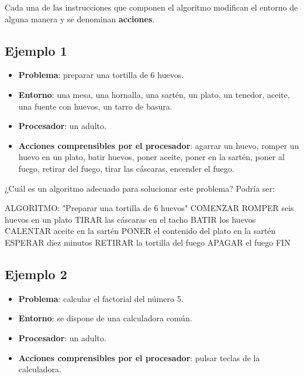 \documentclass[
]{book}
\newenvironment{Shaded}{\begin{snugshade}}{\end{snugshade}}
\newcommand{\NormalTok}[1]{#1}
\providecommand{\tightlist}{%
  \setlength{\itemsep}{0pt}\setlength{\parskip}{0pt}}
\begin{document}
Cada una de las instrucciones que componen el algoritmo modifican el entorno de alguna manera y se denominan \textbf{acciones}.

\hypertarget{ejemplo-1}{%
\subsection{Ejemplo 1}\label{ejemplo-1}}

\begin{itemize}
\tightlist
\item
  \textbf{Problema}: preparar una tortilla de 6 huevos.
\item
  \textbf{Entorno}: una mesa, una hornalla, una sartén, un plato, un tenedor, aceite, una fuente con huevos, un tarro de basura.
\item
  \textbf{Procesador}: un adulto.
\item
  \textbf{Acciones comprensibles por el procesador}: agarrar un huevo, romper un huevo en un plato, batir huevos, poner aceite, poner en la sartén, poner al fuego, retirar del fuego, tirar las cáscaras, encender el fuego.
\end{itemize}

¿Cuál es un algoritmo adecuado para solucionar este problema? Podría ser:

\begin{Shaded}
\begin{Highlighting}[]
\NormalTok{ALGORITMO: "Preparar una tortilla de 6 huevos"}
\NormalTok{COMENZAR}
\NormalTok{    ROMPER seis huevos en un plato}
\NormalTok{    TIRAR las cáscaras en el tacho}
\NormalTok{    BATIR los huevos}
\NormalTok{    CALENTAR aceite en la sartén}
\NormalTok{    PONER el contenido del plato en la sartén}
\NormalTok{    ESPERAR diez minutos}
\NormalTok{    RETIRAR la tortilla del fuego}
\NormalTok{    APAGAR el fuego}
\NormalTok{FIN}
\end{Highlighting}
\end{Shaded}

\hypertarget{ejemplo-2}{%
\subsection{Ejemplo 2}\label{ejemplo-2}}

\begin{itemize}
\tightlist
\item
  \textbf{Problema}: calcular el factorial del número 5.
\item
  \textbf{Entorno}: se dispone de una calculadora común.
\item
  \textbf{Procesador}: un adulto.
\item
  \textbf{Acciones comprensibles por el procesador}: pulsar teclas de la calculadora.
\end{itemize}
\end{document}
